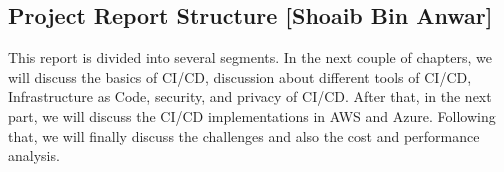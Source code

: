 \subsection{Project Report Structure [Shoaib Bin Anwar]}
This report is divided into several segments. In the next couple of chapters, we will discuss the basics of CI/CD, discussion about different tools of CI/CD, Infrastructure as Code, security, and privacy of CI/CD. After that, in the next part, we will discuss the CI/CD implementations in AWS and Azure. Following that, we will finally discuss the challenges and also the cost and performance analysis.
